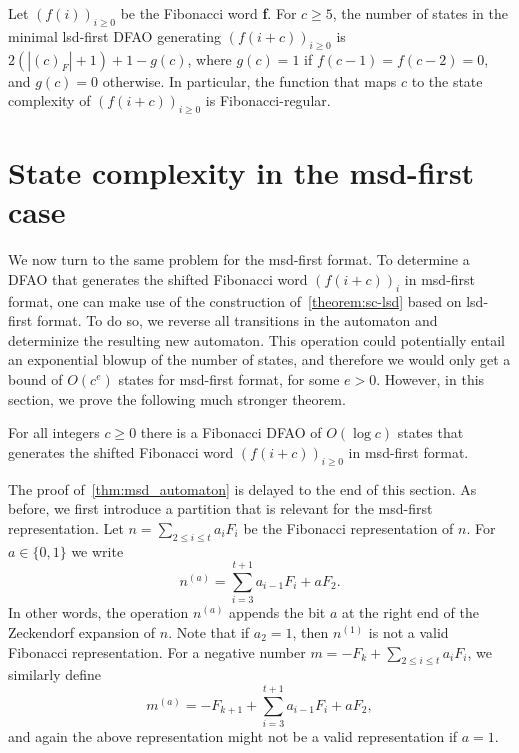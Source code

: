 \documentclass[12pt,runningheads]{llncs}
\begin{document}
\begin{theorem} \label{thm:lsd-first-optimality}
    Let $(f(i))_{i \geq 0}$ be the Fibonacci word {\bf f}. For $c \geq 5$, the number of states in the minimal lsd-first DFAO generating $(f(i+c))_{i \geq 0}$ is $2(|(c)_F|+1)+1-g(c)$, where $g(c)=1$ if $f(c-1)=f(c-2)=0$, and $g(c)=0$ otherwise. In particular, the function that maps $c$ to the state complexity of $(f(i+c))_{i \geq 0}$ is Fibonacci-regular. 
\end{theorem}

\section{State complexity in the msd-first case}\label{sec:msd}

We now turn to the same problem for the msd-first format. To determine a DFAO that generates the shifted Fibonacci word $(f(i+c))_i$ in msd-first format, one can make use of the construction of~\cref{theorem:sc-lsd} based on lsd-first format. To do so, we reverse all transitions in the automaton and determinize the resulting new automaton. This operation could potentially entail an exponential blowup of the number of states, and therefore we would only get a bound of $O(c^e)$ states for msd-first format, for some $e>0$. However, in this section, we prove the following much stronger theorem.
\begin{theorem}\label{thm:msd_automaton}
For all integers $c \geq 0$ there is a Fibonacci DFAO of $O(\log c)$ states that generates the shifted Fibonacci word $(f(i+c))_{i \geq 0}$ in msd-first format.
\end{theorem}

The proof of~\cref{thm:msd_automaton} is delayed to the end of this section. As before, we first introduce a partition that is relevant for the msd-first representation. Let $n = \sum_{2 \leq i \leq t} a_i F_{i}$ be the Fibonacci representation of $n$. For $a \in \{0,1\}$ we write 
\begin{equation}\label{eq:append_delta_pos}
    n^{(a)} = \sum_{i=3}^{t+1} a_{i-1} F_{i} + a F_2.
\end{equation} 
In other words, the operation $n^{(a)}$ appends the bit $a$ at the right end of the Zeckendorf expansion of $n$. Note that if $a_2=1$, then $n^{(1)}$ is not a valid Fibonacci representation. For a negative number $m=-F_k + \sum_{2 \leq i \leq t} a_i F_{i}$, we similarly define
\begin{equation}\label{eq:append_delta_neg}
    m^{(a)}
    = - F_{k+1} + \sum_{i=3}^{t+1} a_{i-1} F_i + a F_2, 
\end{equation} and again the above representation might not be a valid representation if $a = 1$. 
\end{document}
